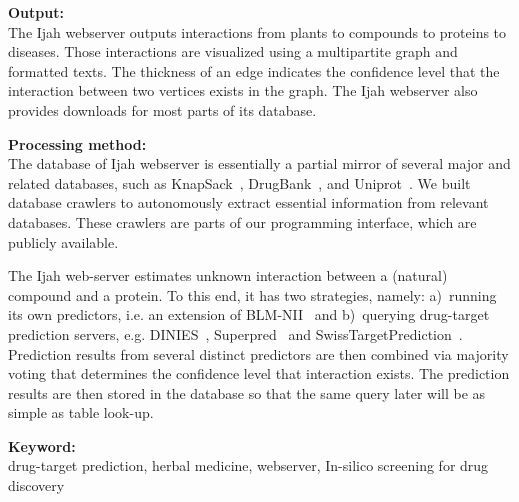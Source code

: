 \noindent
\textbf{Output:} \\
The Ijah webserver outputs interactions from plants to compounds to proteins to diseases.
Those interactions are visualized using a multipartite graph and formatted texts.
The thickness of an edge indicates the confidence level that the interaction between two vertices exists in the graph.
The Ijah webserver also provides downloads for most parts of its database.

\noindent
\textbf{Processing method:}\\
The database of Ijah webserver is essentially a partial mirror of
several major and related databases, such as KnapSack~\cite{pmid23292603}, DrugBank~\cite{pmid21059682}, and Uniprot~\cite{pmid25348405}.
We built database crawlers to autonomously extract essential information from relevant databases.
These crawlers are parts of our programming interface, which are publicly available.

The Ijah web-server estimates unknown interaction between a (natural) compound and a protein.
To this end, it has two strategies, namely:
a)~running its own predictors, i.e. an extension of BLM-NII~\cite{mei} and
b)~querying drug-target prediction servers, e.g. DINIES~\cite{YamanishiKMSKG14}, Superpred~\cite{NickelGEBRGDP14} and SwissTargetPrediction~\cite{GfellerGWDMZ14}.
Prediction results from several distinct predictors are then combined via
majority voting that determines the confidence level that interaction exists.
The prediction results are then stored in the database so that the same query later
will be as simple as table look-up.

\noindent
\textbf{Keyword:}\\
 drug-target prediction, herbal medicine, webserver, In-silico screening for drug discovery

{\footnotesize

}
